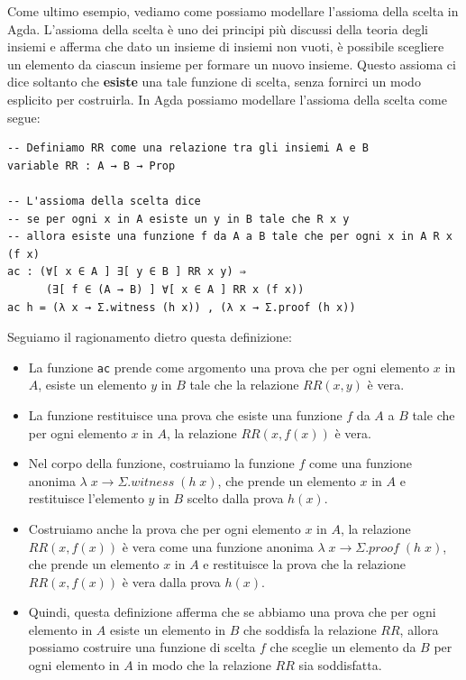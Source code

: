 \documentclass[a4paper]{article}
\theoremstyle{definition}
\theoremstyle{remark}
\begin{document}
Come ultimo esempio, vediamo come possiamo modellare l'assioma della scelta in Agda.
L'assioma della scelta è uno dei principi più discussi della teoria degli insiemi e afferma che
dato un insieme di insiemi non vuoti, è possibile scegliere un elemento da ciascun insieme per formare un nuovo insieme.
Questo assioma ci dice soltanto che \textbf{esiste} una tale funzione di scelta, senza fornirci un modo esplicito per costruirla.
In Agda possiamo modellare l'assioma della scelta come segue:
\begin{verbatim}
-- Definiamo RR come una relazione tra gli insiemi A e B
variable RR : A → B → Prop

-- L'assioma della scelta dice
-- se per ogni x in A esiste un y in B tale che R x y
-- allora esiste una funzione f da A a B tale che per ogni x in A R x (f x)
ac : (∀[ x ∈ A ] ∃[ y ∈ B ] RR x y) ⇒ 
      (∃[ f ∈ (A → B) ] ∀[ x ∈ A ] RR x (f x))
ac h = (λ x → Σ.witness (h x)) , (λ x → Σ.proof (h x))
\end{verbatim}
Seguiamo il ragionamento dietro questa definizione:
\begin{itemize}
  \item La funzione \texttt{ac} prende come argomento una prova che per ogni elemento \( x \) in \( A \), esiste un elemento \( y \) in \( B \) tale che la relazione \( RR(x, y) \) è vera.
  \item La funzione restituisce una prova che esiste una funzione \( f \) da \( A \) a \( B \) tale che per ogni elemento \( x \) in \( A \), la relazione \( RR(x, f(x)) \) è vera.
  \item Nel corpo della funzione, costruiamo la funzione \( f \) come una funzione anonima \( λ \; x → Σ.witness \; (h \; x) \), che prende un elemento \( x \) in \( A \) e restituisce l'elemento \( y \) in \( B \) scelto dalla prova \( h(x) \).
  \item Costruiamo anche la prova che per ogni elemento \( x \) in \( A \), la relazione \( RR(x, f(x)) \) è vera come una funzione anonima \( λ \; x → Σ.proof \; (h \; x) \), che prende un elemento \( x \) in \( A \) e restituisce la prova che la relazione \( RR(x, f(x)) \) è vera dalla prova \( h(x) \).
  \item Quindi, questa definizione afferma che se abbiamo una prova che per ogni elemento in \( A \) esiste un elemento in \( B \) che soddisfa la relazione \( RR \), allora possiamo costruire una funzione di scelta \( f \) che sceglie un elemento da \( B \) per ogni elemento in \( A \) in modo che la relazione \( RR \) sia soddisfatta.
\end{itemize}
\end{document}
